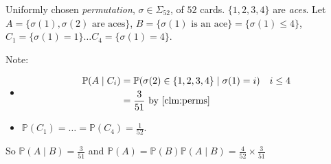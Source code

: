 \begin{example}
    Uniformly chosen \emph{permutation}, $\sigma \in \Sigma_{52}$, of $52$ cards.
    $\{1, 2, 3, 4\}$ are \emph{aces}.
    Let $A = \{\sigma(1), \sigma(2) \text{ are aces}\}$, $B = \{\sigma(1) \text{ is an ace}\} = \{\sigma(1) \leq 4\}$, $C_1 = \{\sigma(1) = 1\} \dots C_4 = \{\sigma(1) = 4\}$.

    Note:
    \begin{itemize}
        \item \begin{align*}
            \mathbb{P}(A \mid C_i) &= \mathbb{P}(\sigma(2) \in \{1, 2, 3, 4\} \mid \sigma(1) = i) \quad i \leq 4 \\
            &= \frac{3}{51} \text{ by \Cref{clm:perms}}
        \end{align*} 
        \item $\mathbb{P}(C_1) = \dots = \mathbb{P}(C_4) = \frac{1}{52}$.
    \end{itemize} 
    So $\mathbb{P}(A \mid B) = \frac{3}{51}$ and $\mathbb{P}(A) = \mathbb{P}(B) \mathbb{P}(A \mid B) = \frac{4}{52} \times \frac{3}{51}$
\end{example}
